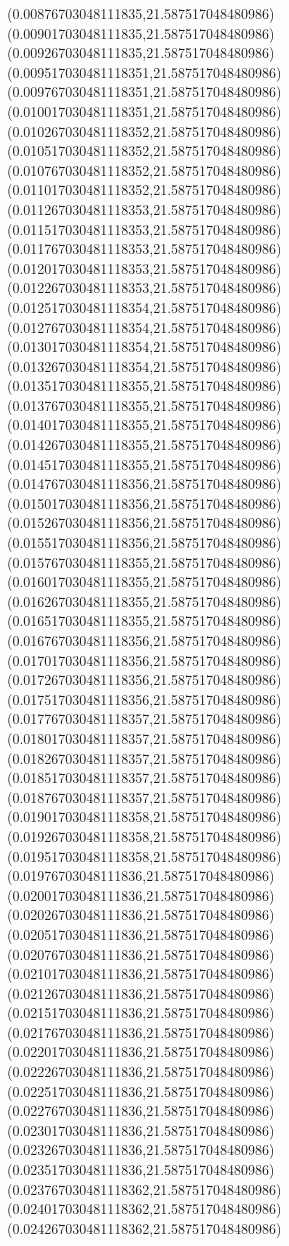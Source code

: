 {(0.00876703048111835,21.587517048480986)
(0.00901703048111835,21.587517048480986)
(0.00926703048111835,21.587517048480986)
(0.009517030481118351,21.587517048480986)
(0.009767030481118351,21.587517048480986)
(0.010017030481118351,21.587517048480986)
(0.010267030481118352,21.587517048480986)
(0.010517030481118352,21.587517048480986)
(0.010767030481118352,21.587517048480986)
(0.011017030481118352,21.587517048480986)
(0.011267030481118353,21.587517048480986)
(0.011517030481118353,21.587517048480986)
(0.011767030481118353,21.587517048480986)
(0.012017030481118353,21.587517048480986)
(0.012267030481118353,21.587517048480986)
(0.012517030481118354,21.587517048480986)
(0.012767030481118354,21.587517048480986)
(0.013017030481118354,21.587517048480986)
(0.013267030481118354,21.587517048480986)
(0.013517030481118355,21.587517048480986)
(0.013767030481118355,21.587517048480986)
(0.014017030481118355,21.587517048480986)
(0.014267030481118355,21.587517048480986)
(0.014517030481118355,21.587517048480986)
(0.014767030481118356,21.587517048480986)
(0.015017030481118356,21.587517048480986)
(0.015267030481118356,21.587517048480986)
(0.015517030481118356,21.587517048480986)
(0.015767030481118355,21.587517048480986)
(0.016017030481118355,21.587517048480986)
(0.016267030481118355,21.587517048480986)
(0.016517030481118355,21.587517048480986)
(0.016767030481118356,21.587517048480986)
(0.017017030481118356,21.587517048480986)
(0.017267030481118356,21.587517048480986)
(0.017517030481118356,21.587517048480986)
(0.017767030481118357,21.587517048480986)
(0.018017030481118357,21.587517048480986)
(0.018267030481118357,21.587517048480986)
(0.018517030481118357,21.587517048480986)
(0.018767030481118357,21.587517048480986)
(0.019017030481118358,21.587517048480986)
(0.019267030481118358,21.587517048480986)
(0.019517030481118358,21.587517048480986)
(0.01976703048111836,21.587517048480986)
(0.02001703048111836,21.587517048480986)
(0.02026703048111836,21.587517048480986)
(0.02051703048111836,21.587517048480986)
(0.02076703048111836,21.587517048480986)
(0.02101703048111836,21.587517048480986)
(0.02126703048111836,21.587517048480986)
(0.02151703048111836,21.587517048480986)
(0.02176703048111836,21.587517048480986)
(0.02201703048111836,21.587517048480986)
(0.02226703048111836,21.587517048480986)
(0.02251703048111836,21.587517048480986)
(0.02276703048111836,21.587517048480986)
(0.02301703048111836,21.587517048480986)
(0.02326703048111836,21.587517048480986)
(0.02351703048111836,21.587517048480986)
(0.023767030481118362,21.587517048480986)
(0.024017030481118362,21.587517048480986)
(0.024267030481118362,21.587517048480986)
}

